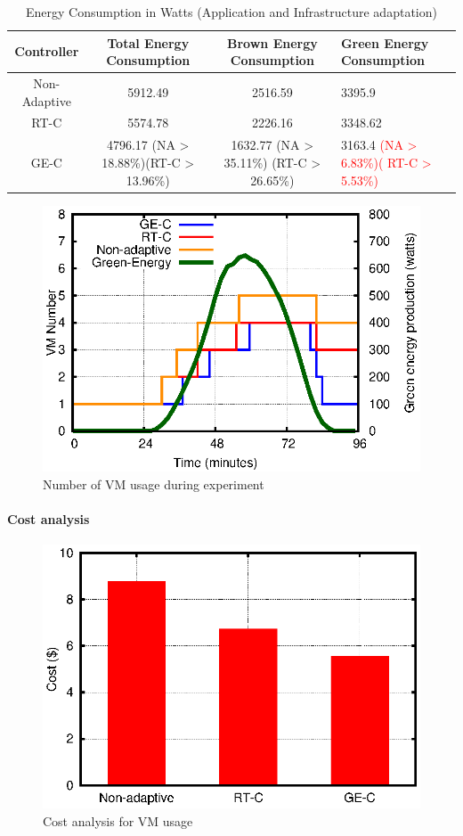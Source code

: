 \begin{table}
\caption{Energy Consumption in Watts (Application and Infrastructure adaptation)}
  \label{tab:watt2}
\begin{tabular}{cccl}
\toprule
Controller & Total Energy Consumption & Brown Energy Consumption & Green Energy Consumption\\
\midrule
Non-Adaptive & 5912.49 & 2516.59 & 3395.9 \\
RT-C & 5574.78 & 2226.16 & 3348.62  \\  %
GE-C & 4796.17 (NA > 18.88\%)(RT-C > 13.96\%) & 1632.77 (NA > 35.11\%) (RT-C > 26.65\%) & 3163.4 \textcolor{red}{(NA > 6.83\%)( RT-C > 5.53\%)} \\
\bottomrule
\end{tabular}
\end{table}

\begin{figure} [htb]
\centering
\includegraphics[scale=.8]{Graphs/vm.eps}
\caption{Number of VM usage during experiment}
\label{fig:vm}
\end{figure}



\paragraph{\textbf{Cost analysis}}

\begin{figure} [htb]
\centering
\includegraphics[scale=.7]{Graphs/cost.eps}
\caption{Cost analysis for VM usage}
\label{fig:vm}
\end{figure}
